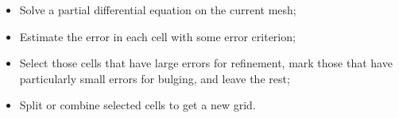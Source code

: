 \documentclass[]{pracamgr}
\begin{document}
        \begin{itemize}
          \item Solve a partial differential equation on the current mesh;
          \item Estimate the error in each cell with some error criterion;
          \item Select those cells that have large errors for refinement, mark those that have particularly small errors for bulging, and leave the rest;
          \item Split or combine selected cells to get a new grid.
        \end{itemize}
\end{document}
